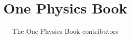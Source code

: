\documentclass[11pt,a4paper,twoside,openany]{book}
\title{One Physics Book}
\author{The One Physics Book contributors}
\date{\bookdate}
\begin{document}
\frontmatter




\tableofcontents

\mainmatter



\appendix
\part{\omsolutionspart}


\backmatter
\printindex
\end{document}
